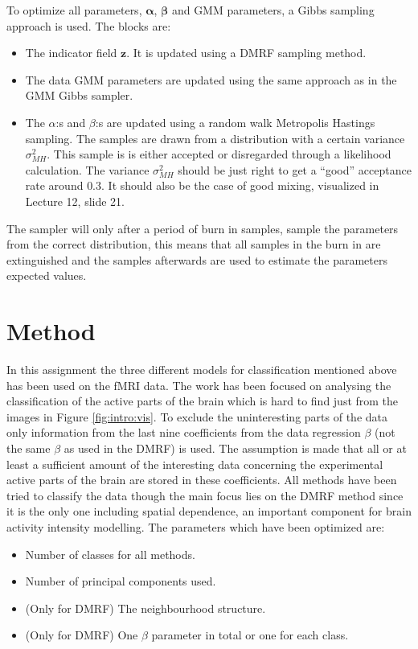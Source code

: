 \documentclass[a4paper,english]{article}
\begin{document}
To optimize all parameters, $\boldsymbol{\alpha}$, $\boldsymbol{\beta}$ and GMM parameters, a Gibbs sampling approach is used.
The blocks are:
\begin{itemize}
  \item The indicator field $\boldsymbol{z}$. It is updated using a DMRF sampling method.
  \item The data GMM parameters are updated using the same approach as in the GMM Gibbs sampler.
  \item The $\alpha$:s and $\beta$:s are updated using a random walk Metropolis Hastings sampling.
    The samples are drawn from a distribution with a certain variance $\sigma_{MH}^2$.
    This sample is is either accepted or disregarded through a likelihood calculation.
    The variance $\sigma_{MH}^2$ should be just right to get a ``good'' acceptance rate around $0.3$.
    It should also be the case of good mixing, visualized in Lecture 12, slide 21\cite{L12}.
\end{itemize}
The sampler will only after a period of burn in samples, sample the parameters from the correct distribution, this means that all samples in the burn in are extinguished and the samples afterwards are used to estimate the parameters expected values.


\section{Method}
In this assignment the three different models for classification mentioned above has been used on the fMRI data.
The work has been focused on analysing the classification of the active parts of the brain which is hard to find just from the images in Figure \ref{fig:intro:vis}.
To exclude the uninteresting parts of the data only information from the last nine coefficients from the data regression $\beta$ (not the same $\beta$ as used in the DMRF) is used.
The assumption is made that all or at least a sufficient amount of the interesting data concerning the experimental active parts of the brain are stored in these coefficients.
All methods have been tried to classify the data though the main focus lies on the DMRF method since it is the only one including spatial dependence, an important component for brain activity intensity modelling.
The parameters which have been optimized are:
\begin{itemize}
  \item Number of classes for all methods.
  \item Number of principal components used.
  \item (Only for DMRF) The neighbourhood structure.
  \item (Only for DMRF) One $\beta$ parameter in total or one for each class.
\end{itemize}
\end{document}
